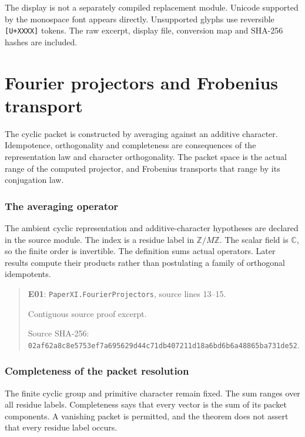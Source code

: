 \documentclass[10pt,oneside]{book}
\begin{document}
The display is not a separately compiled replacement module. Unicode supported by the monospace font appears directly. Unsupported glyphs use reversible \texttt{[U+XXXX]} tokens. The raw excerpt, display file, conversion map and SHA-256 hashes are included.


\chapter{Fourier projectors and Frobenius transport}
The cyclic packet is constructed by averaging against an additive character. Idempotence, orthogonality and completeness are consequences of the representation law and character orthogonality. The packet space is the actual range of the computed projector, and Frobenius transports that range by its conjugation law.

\subsection{The averaging operator}
\label{guide:E01}
The ambient cyclic representation and additive-character hypotheses are declared in the source module. The index is a residue label in \(\mathbb Z/M\mathbb Z\). The scalar field is \(\mathbb C\), so the finite order is invertible.
The definition sums actual operators. Later results compute their products rather than postulating a family of orthogonal idempotents.

\begin{quote}\footnotesize\textbf{E01}: \nolinkurl{PaperXI.FourierProjectors}, source lines 13--15.\par Contiguous source proof excerpt.\par Source SHA-256: {\scriptsize\texttt{02af62a8c8e5753ef7a695629d44c71db407211d18a6bd6b6a48865ba731de52}}.\end{quote}


\subsection{Completeness of the packet resolution}
\label{guide:E02}
The finite cyclic group and primitive character remain fixed. The sum ranges over all residue labels.
Completeness says that every vector is the sum of its packet components. A vanishing packet is permitted, and the theorem does not assert that every residue label occurs.
\end{document}
